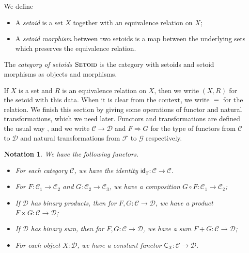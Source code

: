 \documentclass[9pt]{entcs}
\newtheorem{notation}[thm]{Notation}
\newcommand{\category}[1]{\textsc{#1}}
\newcommand{\functortxt}[1]{\mathsf{#1}}
\newcommand{\0}{\textbf{0}} %
\newcommand{\1}{\textbf{1}} %
\newcommand{\setoids}{\category{Setoid}} %
\newcommand{\functor}[2]{#1 \longrightarrow #2} %
\newcommand{\idf}[1]{\functortxt{id}_{#1}} %
\newcommand{\Cf}[1]{\functortxt{C}_{#1}} %
\newcommand{\compf}[2]{#2 \circ #1} %
\newcommand{\prodf}[2]{#1 \times #2} %
\newcommand{\sumf}[2]{#1 + #2} %
\newcommand{\nattrans}[2]{#1 \Longrightarrow #2} %
\begin{document}
\begin{definition}
\label{def:setoid}
We define
\begin{itemize}
	\item A \emph{setoid} is a set $X$ together with an equivalence relation on $X$;
	\item A \emph{setoid morphism} between two setoids  is a map between the underlying sets which preserves the equivalence relation.
\end{itemize}
The \emph{category of setoids} $\setoids$ is the category with setoids and setoid morphisms as objects and morphisms.
\end{definition}

If $X$ is a set and $R$ is an equivalence relation on $X$, then we write $(X, R)$ for the setoid with this data.
When it is clear from the context, we write $\equiv$ for the relation.
We finish this section by giving some operations of functor and natural transformations, which we need later.
Functors and transformations are defined the usual way \cite{mac2013categories}, and we write $\functor{\mathcal{C}}{\mathcal{D}}$ and $\nattrans{F}{G}$ for the type of functors from $\mathcal{C}$ to $\mathcal{D}$ and natural transformations from $\mathcal{F}$ to $\mathcal{G}$ respectively.

\begin{notation}
\label{def:functor}
We have the following functors.
\begin{itemize}
	\item For each category $\mathcal{C}$, we have the identity $\idf{\mathcal{C}} : \functor{\mathcal{C}}{\mathcal{C}}$.
	\item For $F : \functor{\mathcal{C}_1}{\mathcal{C}_2}$ and $G : \functor{\mathcal{C}_2}{\mathcal{C}_3}$, we have a composition $\compf{F}{G} : \functor{\mathcal{C}_1}{\mathcal{C}_2}$;
	\item If $\mathcal{D}$ has binary products, then for $F, G : \functor{\mathcal{C}}{\mathcal{D}}$, we have a product $\prodf{F}{G} : \functor{\mathcal{C}}{\mathcal{D}}$;
	\item If $\mathcal{D}$ has binary sum, then for $F, G : \functor{\mathcal{C}}{\mathcal{D}}$, we have a sum $\sumf{F}{G} : \functor{\mathcal{C}}{\mathcal{D}}$;
	\item For each object $X : \mathcal{D}$, we have a constant functor $\Cf{X} : \functor{\mathcal{C}}{\mathcal{D}}$.
\end{itemize}
\end{notation}
\end{document}
